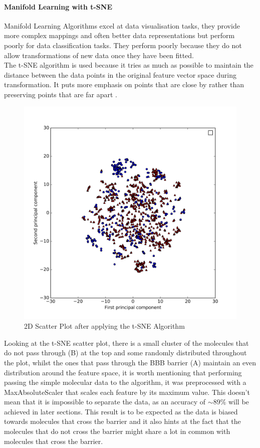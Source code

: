 \documentclass[a4paper,12pt]{report}
\begin{document}
		\paragraph{Manifold Learning with t-SNE}
		Manifold Learning Algorithms excel at data visualisation tasks, they provide more complex mappings and often better data representations but perform poorly for data classification tasks. They perform poorly because they do not allow transformations of new data once they have been fitted.\\
		The t-SNE algorithm is used because it tries as much as possible to maintain the distance between the data points in the original feature vector space during transformation. It puts more emphasis on points that are close by rather than preserving points that are far apart \cite{Mueller2016}.
		\begin{figure}[H]
			\centering
			\includegraphics[width=\textwidth,scale=1,totalheight=0.4\textheight]{images/scatter_tsne}
			\caption{2D Scatter Plot after applying the t-SNE Algorithm}
			\label{fig:scatter_tsne_2D}
		\end{figure}
		Looking at the t-SNE scatter plot, there is a small cluster of the molecules that do not pass through (B) at the top and some randomly distributed throughout the plot, whilst the ones that pass through the BBB barrier (A) maintain an even distribution around the feature space, it is worth mentioning that performing passing the simple molecular data to the algorithm, it was preprocessed with a MaxAbsoluteScaler that scales each feature by its maximum value. This doesn't mean that it is impossible to separate the data, as an accuracy of $\sim89\%$ will be achieved in later sections. This result is to be expected as the data is biased towards molecules that cross the barrier and it also hints at the fact that the molecules that do not cross the barrier might share a lot in common with molecules that cross the barrier.
\end{document}
